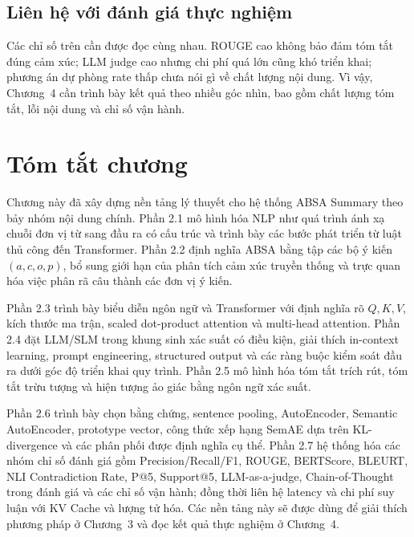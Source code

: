 \subsection{Liên hệ với đánh giá thực nghiệm}
\label{subsec:dev-chap2-evaluation-link}

Các chỉ số trên cần được đọc cùng nhau. ROUGE cao không bảo đảm tóm tắt đúng cảm xúc; LLM judge cao nhưng chi phí quá lớn cũng khó triển khai; phương án dự phòng rate thấp chưa nói gì về chất lượng nội dung. Vì vậy, Chương~4 cần trình bày kết quả theo nhiều góc nhìn, bao gồm chất lượng tóm tắt, lỗi nội dung và chỉ số vận hành.

\section*{Tóm tắt chương}
\label{sec:dev-chap2-summary}

Chương này đã xây dựng nền tảng lý thuyết cho hệ thống ABSA Summary theo bảy nhóm nội dung chính. Phần 2.1 mô hình hóa NLP như quá trình ánh xạ chuỗi đơn vị từ sang đầu ra có cấu trúc và trình bày các bước phát triển từ luật thủ công đến Transformer. Phần 2.2 định nghĩa ABSA bằng tập các bộ ý kiến $(a,c,o,p)$, bổ sung giới hạn của phân tích cảm xúc truyền thống và trực quan hóa việc phân rã câu thành các đơn vị ý kiến.

Phần 2.3 trình bày biểu diễn ngôn ngữ và Transformer với định nghĩa rõ $Q,K,V$, kích thước ma trận, scaled dot-product attention và multi-head attention. Phần 2.4 đặt LLM/SLM trong khung sinh xác suất có điều kiện, giải thích in-context learning, prompt engineering, structured output và các ràng buộc kiểm soát đầu ra dưới góc độ triển khai quy trình. Phần 2.5 mô hình hóa tóm tắt trích rút, tóm tắt trừu tượng và hiện tượng ảo giác bằng ngôn ngữ xác suất.

Phần 2.6 trình bày chọn bằng chứng, sentence pooling, AutoEncoder, Semantic AutoEncoder, prototype vector, công thức xếp hạng SemAE dựa trên KL-divergence và các phân phối được định nghĩa cụ thể. Phần 2.7 hệ thống hóa các nhóm chỉ số đánh giá gồm Precision/Recall/F1, ROUGE, BERTScore, BLEURT, NLI Contradiction Rate, P@5, Support@5, LLM-as-a-judge, Chain-of-Thought trong đánh giá và các chỉ số vận hành; đồng thời liên hệ latency và chi phí suy luận với KV Cache và lượng tử hóa. Các nền tảng này sẽ được dùng để giải thích phương pháp ở Chương~3 và đọc kết quả thực nghiệm ở Chương~4.
